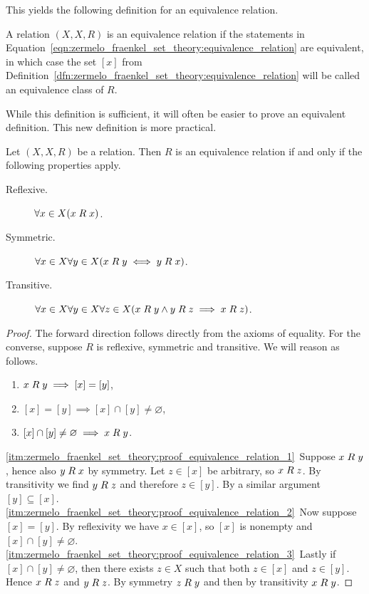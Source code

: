 \documentclass[../main.tex]{subfiles}
\begin{document}
This yields the following definition for an equivalence relation.
\begin{definition}
    A relation $(X,X,R)$ is an equivalence relation if the statements in Equation~\eqref{eqn:zermelo_fraenkel_set_theory:equivalence_relation} are equivalent, in which case the set $[x]$ from Definition~\ref{dfn:zermelo_fraenkel_set_theory:equivalence_relation} will be called an equivalence class of $R$.
\end{definition}
While this definition is sufficient, it will often be easier to prove an equivalent definition. This new definition is more practical.
\begin{proposition}
    Let $(X,X,R)$ be a relation. Then $R$ is an equivalence relation if and only if the following properties apply.
    \begin{description}
        \item[Reflexive.] $\forall x\in X(x\mathrel{R} x)$.
        \item[Symmetric.] $\forall x\in X\forall y\in X(x\mathrel{R} y\iff y\mathrel{R} x)$.
        \item[Transitive.] $\forall x\in X\forall y\in X\forall z\in X(x\mathrel{R} y\land y\mathrel{R} z\implies x\mathrel{R} z)$.
    \end{description}
\end{proposition}
\begin{proof}
    The forward direction follows directly from the axioms of equality. For the converse, suppose $R$ is reflexive, symmetric and transitive. We will reason as follows.
    \begin{enumerate}[label=\arabic*.]
        \item\label{itm:zermelo_fraenkel_set_theory:proof_equivalence_relation_1} $x\mathrel{R} y\implies[x]=[y]$,
        \item\label{itm:zermelo_fraenkel_set_theory:proof_equivalence_relation_2} $[x]=[y]\implies[x]\cap[y]\neq\varnothing$,
        \item\label{itm:zermelo_fraenkel_set_theory:proof_equivalence_relation_3} $[x]\cap[y]\neq\varnothing\implies x\mathrel{R} y$.
    \end{enumerate}
    \ref{itm:zermelo_fraenkel_set_theory:proof_equivalence_relation_1}~Suppose $x\mathrel{R} y$, hence also $y\mathrel{R} x$ by symmetry. Let $z\in[x]$ be arbitrary, so $x\mathrel{R} z$. By transitivity we find $y\mathrel{R} z$ and therefore $z\in[y]$. By a similar argument $[y]\subseteq[x]$. \ref{itm:zermelo_fraenkel_set_theory:proof_equivalence_relation_2}~Now suppose $[x]=[y]$. By reflexivity we have $x\in[x]$, so $[x]$ is nonempty and $[x]\cap[y]\neq\varnothing$. \ref{itm:zermelo_fraenkel_set_theory:proof_equivalence_relation_3}~Lastly if $[x]\cap[y]\neq\varnothing$, then there exists $z\in X$ such that both $z\in[x]$ and $z\in[y]$. Hence $x\mathrel{R} z$ and $y\mathrel{R} z$. By symmetry $z\mathrel{R} y$ and then by transitivity $x\mathrel{R} y$.
\end{proof}
\end{document}
